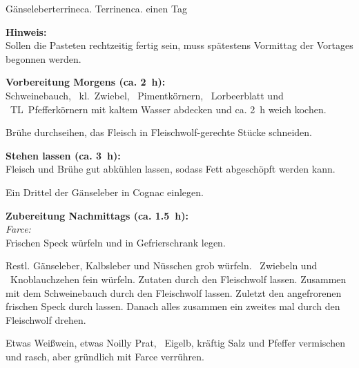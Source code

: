 \begin{MyRecipe}{Gänseleberterrine}{ca.  Terrinen}{ca. einen Tag}
		
		
	\textbf{Hinweis:}\\
	Sollen die Pasteten rechtzeitig fertig sein, muss spätestens Vormittag der Vortages begonnen werden.\par\bigskip

	\textbf{Vorbereitung Morgens (ca. 2~h):}\\
	Schweinebauch, ~kl.~Zwiebel, ~Pimentkörnern, ~Lorbeerblatt und ~TL~Pfefferkörnern mit kaltem Wasser abdecken und ca. 2~h weich kochen.\par
	Brühe durchseihen, das Fleisch in Fleischwolf-gerechte Stücke schneiden.\par\bigskip
	
	\textbf{Stehen lassen (ca. 3~h):}\\	
	Fleisch und Brühe gut abkühlen lassen, sodass Fett abgeschöpft werden kann.\par
	Ein Drittel der Gänseleber in Cognac einlegen.\par\bigskip
	
	\textbf{Zubereitung Nachmittags (ca. 1.5~h):}\\
	\textit{Farce:}\\	
	Frischen Speck würfeln und in Gefrierschrank legen.\par
	Restl. Gänseleber, Kalbsleber und Nüsschen grob würfeln. ~Zwiebeln und ~Knoblauchzehen fein würfeln. Zutaten durch den Fleischwolf lassen. Zusammen mit dem Schweinebauch durch den Fleischwolf lassen. Zuletzt den angefrorenen frischen Speck durch lassen. Danach alles zusammen ein zweites mal durch den Fleischwolf drehen.\par
	Etwas Weißwein, etwas Noilly Prat, ~Eigelb, kräftig Salz und Pfeffer vermischen und rasch, aber gründlich mit Farce verrühren.\par\medskip
		

\end{MyRecipe}
